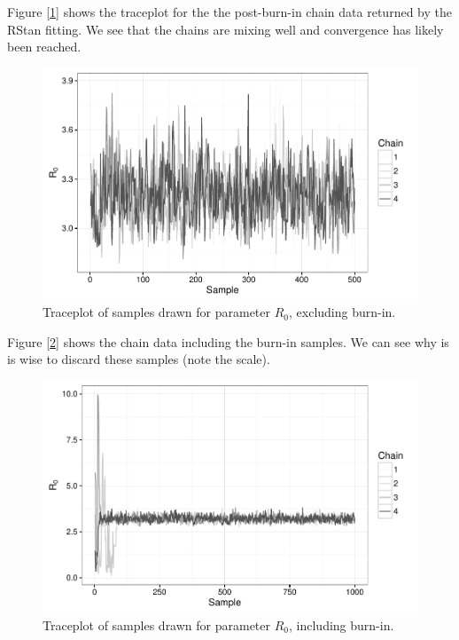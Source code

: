     Figure [\ref{traceplot}] shows the traceplot for the the post-burn-in chain data returned by the RStan fitting. We see that the chains are mixing well and convergence has likely been reached.

    \begin{figure}
        \centering
        \captionsetup{width=0.8\linewidth}
        \includegraphics[width=\textwidth]{./images/traceplotR0.pdf}
        \caption{Traceplot of samples drawn for parameter $R_0$, excluding burn-in. \label{traceplot}}
    \end{figure}

	Figure [\ref{traceplot2}] shows the chain data including the burn-in samples. We can see why is is wise to discard these samples (note the scale).

    \begin{figure}
        \centering
        \captionsetup{width=0.8\linewidth}
        \includegraphics[width=\textwidth]{./images/traceplotR0_inc.pdf}
        \caption{Traceplot of samples drawn for parameter $R_0$, including burn-in. \label{traceplot2}}
    \end{figure}

